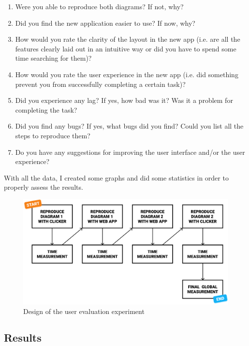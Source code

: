 \documentclass[]{usiinfbachelorproject}
\begin{document}
\begin{enumerate}
	\item Were you able to reproduce both diagrams? If not, why?
	\item Did you find the new application easier to use? If now, why?
	\item How would you rate the clarity of the layout in the new app (i.e. are all the features clearly laid out in an intuitive way or did you have to spend some time searching for them)?
	\item How would you rate the user experience in the new app (i.e. did something prevent you from successfully completing a certain task)?
	\item Did you experience any lag? If yes, how bad was it? Was it a problem for completing the task?
	\item Did you find any bugs? If yes, what bugs did you find? Could you list all the steps to reproduce them?
	\item Do you have any suggestions for improving the user interface and/or the user experience?
\end{enumerate}

\noindent With all the data, I created some graphs and did some statistics in order to properly assess the results.


\begin{figure}[h!]
\centering
\includegraphics[width=\textwidth-50pt]{figures/experiment-design.png}
\caption {Design of the user evaluation experiment}
\label{tree}
\end{figure}

\vspace{\fill}
\pagebreak

\subsection{Results}
\end{document}
